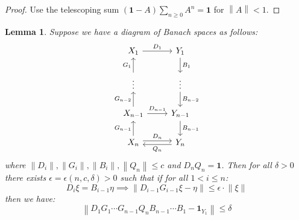 \documentclass[12pt]{article}
\newtheorem{lemma}[theorem]{Lemma}
\theoremstyle{definition}
\theoremstyle{remark}
\numberwithin{equation}{subsection}
\begin{document}
\begin{proof}
Use the telescoping sum $(\mathbf 1-A)\sum_{n\geq 0}A^n=\mathbf 1$ for $\left\|A\right\|<1$.
\end{proof}

\begin{lemma}\label{bootstrappingapprox}
Suppose we have a diagram of Banach spaces as follows:
\begin{equation}
\begin{tikzcd}
X_1\ar{r}{D_1}&Y_1\ar{d}{B_1}\\
\vdots\ar{u}{G_1}&\vdots\ar{d}{B_{n-2}}\\
X_{n-1}\ar{u}{G_{n-2}}\ar{r}{D_{n-1}}&Y_{n-1}\ar{d}{B_{n-1}}\\
X_n\ar{u}{G_{n-1}}\ar[yshift=0.5ex]{r}{D_n}&Y_n\ar[yshift=-0.5ex]{l}{Q_n}
\end{tikzcd}
\end{equation}
where $\left\|D_i\right\|,\left\|G_i\right\|,\left\|B_i\right\|,\left\|Q_n\right\|\leq c$ and $D_nQ_n=\mathbf 1$.  Then for all $\delta>0$ there exists $\epsilon=\epsilon(n,c,\delta)>0$ such that if for all $1<i\leq n$:
\begin{equation}\label{keytocheckforARI}
D_i\xi=B_{i-1}\eta\implies\left\|D_{i-1}G_{i-1}\xi-\eta\right\|\leq\epsilon\cdot\left\|\xi\right\|
\end{equation}
then we have:
\begin{equation}\label{approxbootstrappingworks}
\left\|D_1G_1\cdots G_{n-1}Q_nB_{n-1}\cdots B_1-\mathbf 1_{Y_1}\right\|\leq\delta
\end{equation}
\end{lemma}
\end{document}
